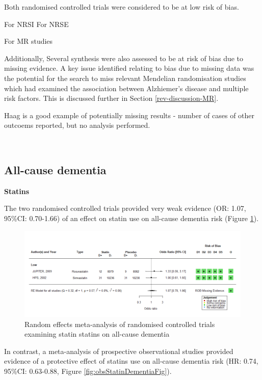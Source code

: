 \documentclass[a4paper, twoside]{templates/ociamthesis}
\begin{document}
Both randomised controlled trials were considered to be at low risk of bias.

For NRSI
For NRSE

For MR studies

Additionally, Several synthesis were also assessed to be at risk of bias due to missing evidence. A key issue identified relating to bias due to missing data was the potential for the search to miss relevant Mendelian randomisation studies which had examined the association between Alzhiemer's disease and multiple risk factors. This is discussed further in Section \ref{rev-discussion-MR}.

Haag is a good example of potentially missing results - number of cases of other outcoems reported, but no analysis performed.

~

\hypertarget{all-cause-dementia}{%
\subsection{All-cause dementia}\label{all-cause-dementia}}

\textbf{Statins}

The two randomised controlled trials provided very weak evidence (OR: 1.07, 95\%CI: 0.70-1.66) of an effect on statin use on all-cause dementia risk (Figure \ref{fig:rctStatinDementiaFig}).





\begin{figure}[H]
\includegraphics[width=1\linewidth]{figures/sys-rev/fp_rct_statins_Dementia} \caption[Random effects meta-analysis of statins on all-cause dementia]{Random effects meta-analysis of randomised controlled trials examining statin statins on all-cause dementia}\label{fig:rctStatinDementiaFig}
\end{figure}

In contrast, a meta-analysis of prospective observational studies provided evidence of a protective effect of statins use on all-cause dementia risk (HR: 0.74, 95\%CI: 0.63-0.88, Figure \ref{fig:obsStatinDementiaFig}).
\end{document}
